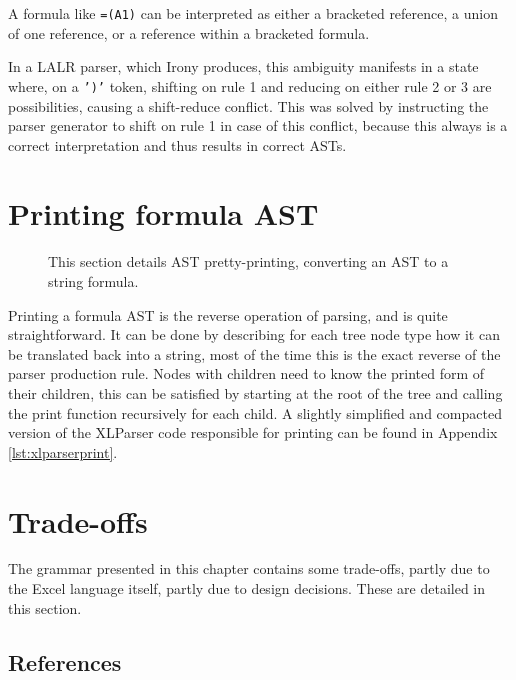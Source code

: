 A formula like \texttt{=(A1)} can be interpreted as either a bracketed reference, a union of one reference, or a reference within a bracketed formula.

In a LALR parser, which Irony produces, this ambiguity manifests in a state where, on a \texttt{')'} token, shifting on rule 1 and reducing on either rule 2 or 3 are possibilities, causing a shift-reduce conflict.
This was solved by instructing the parser generator to shift on rule 1 in case of this conflict, because this always is a correct interpretation and thus results in correct ASTs.

\section{Printing formula AST}
\label{sec:printing}

\noindent
\begin{figure}[h!]
\hspace*{0.003\textwidth}

\caption{This section details AST pretty-printing, converting an AST to a string formula.}
\end{figure}

Printing a formula AST is the reverse operation of parsing, and is quite straightforward.
It can be done by describing for each tree node type how it can be translated back into a string, most of the time this is the exact reverse of the parser production rule.
Nodes with children need to know the printed form of their children, this can be satisfied by starting at the root of the tree and calling the print function recursively for each child.
A slightly simplified and compacted version of the XLParser code responsible for printing can be found in Appendix \ref{lst:xlparserprint}.

\section{Trade-offs}

The grammar presented in this chapter contains some trade-offs, partly due to the Excel language itself, partly due to design decisions.
These are detailed in this section.

\subsection{References}
\label{tradeoff:references}


